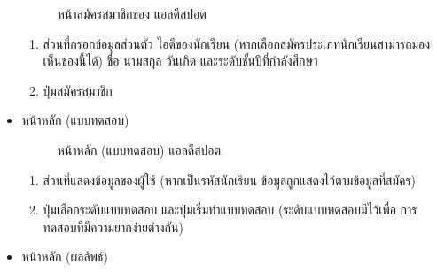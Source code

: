 \documentclass[12pt,oneside,openright,a4paper]{cpe-thai-project}
\begin{document}
\begin{itemize}
\begin{figure}[!ht]
    \caption{หน้าสมัครสมาชิกของ แอลดีสปอต}\label{fig:register3}
  \end{figure}
  \begin{enumerate}
    \item ส่วนที่กรอกข้อมูลส่วนตัว ไอดีของนักเรียน (หากเลือกสมัครประเภทนักเรียนสามารถมองเห็นช่องนี้ได้) ชื่อ นามสกุล วันเกิด และระดับชั้นปีที่กำลังศึกษา
    \item ปุ่มสมัครสมาชิก
  \end{enumerate}
  \newpage
 

  \item หน้าหลัก (แบบทดสอบ)
  \begin{figure}[!ht]\centering
    \setlength{\fboxrule}{0.2mm} %
    \setlength{\fboxsep}{1cm}
    \caption{หน้าหลัก (แบบทดสอบ) แอลดีสปอต}\label{fig:system}
  \end{figure}
  \begin{enumerate}
    \item ส่วนที่แสดงข้อมูลของผู้ใช้ (หากเป็นรหัสนักเรียน ข้อมูลถูกแสดงไว้ตามข้อมูลที่สมัคร)
    \item ปุ่มเลือกระดับแบบทดสอบ และปุ่มเริ่มทำแบบทดสอบ (ระดับแบบทดสอบมีไว้เพื่อ การทดสอบที่มีความยากง่ายต่างกัน)
  \end{enumerate}
  \newpage
  \item หน้าหลัก (ผลลัพธ์)
  \begin{figure}[!ht]\centering
    \setlength{\fboxrule}{0.2mm} %
    \setlength{\fboxsep}{1cm}

\end{figure}
\end{itemize}
\end{document}
